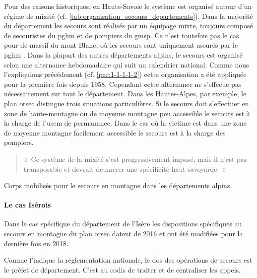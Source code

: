 Pour des raisons historiques, en Haute-Savoie le système est organisé
autour d'un régime de mixité
(cf. \autoref{tab:organisation_secours_departements}). Dans la
majorité du département les secours sont réalisés par un équipage
mixte, toujours composé de secouristes du \ac{pghm} et de pompiers du
\ac{gmsp}. Ce n'est toutefois pas le cas pour de massif du mont Blanc,
où les secours sont uniquement assurés par le \ac{pghm}
\autocite{Halle2007,Boillot2017}. Dans la plupart des autres
départements alpins, le secours est organisé selon une alternance
hebdomadaire qui suit un calendrier national. Comme nous l'expliquions
précédement (cf. \ref{par:1-1-1-1-2}) cette organisation a été
appliquée pour la première fois depuis 1958. Cependant cette
alternance ne s'effecue pas nécessairement sur tout le
département. Dans les Hautes-Alpes, par exemple, le plan \ac{orsec}
distingue trois situations particulières. Si le secours doit
s'effectuer en zone de haute-montagne ou de moyenne montagne peu
accessible le secours est à la charge de l'\ac{usem} de
permanance. Dans le cas où la victime est dans une zone de moyenne
montagne facilement accessible le secours est à la charge des
pompiers.

\begin{quotation}
  «~Ce système de la mixité s'est progressivement imposé, mais il
  n'est pas transposable et devrait deumerer une spécificité
  haut-savoyarde.~»
\end{quotation}

\begin{table}
  \centering
  
  \caption{Corps mobilisés pour le secours en montagne dans les
    départements alpins.}
  \label{tab:organisation_secours_departements}
\end{table}

\paragraph{Le cas Isérois}

Dans le cas spécifique du département de l'Isère les dispositions
spécifiques au secours en montagne du plan \ac{orsec} datent de 2016
et ont été modifiées pour la dernière fois en 2018.

Comme l'indique la réglementation nationale, le \ac{dos} des
opérations de secours est le préfet de département.  C'est au
\ac{codis} de traiter et de centraliser les appels.

